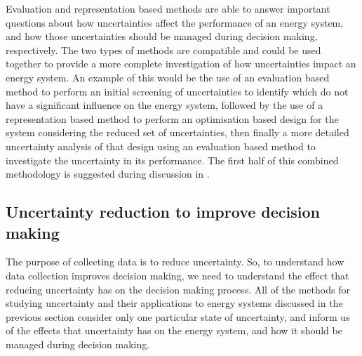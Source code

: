 Evaluation and representation based methods are able to answer important questions about how uncertainties affect the performance of an energy system, and how those uncertainties should be managed during decision making, respectively. The two types of methods are compatible and could be used together to provide a more complete investigation of how uncertainties impact an energy system. An example of this would be the use of an evaluation based method to perform an initial screening of uncertainties to identify which do not have a significant influence on the energy system, followed by the use of a representation based method to perform an optimisation based design for the system considering the reduced set of uncertainties, then finally a more detailed uncertainty analysis of that design using an evaluation based method to investigate the uncertainty in its performance.
The first half of this combined methodology is suggested during discussion in .



\subsection{Uncertainty reduction to improve decision making} \label{sec:uncertainty-reduction-lit}


The purpose of collecting data is to reduce uncertainty\footnotemark. So, to understand how data collection improves decision making, we need to understand the effect that reducing uncertainty has on the decision making process.
All of the methods for studying uncertainty and their applications to energy systems discussed in the previous section consider only one particular state of uncertainty, and inform us of the effects that uncertainty has on the energy system, and how it should be managed during decision making.\\

